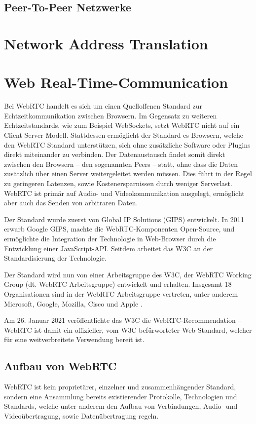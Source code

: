 \subsection{Peer-To-Peer Netzwerke}

\section{Network Address Translation}

\section{Web Real-Time-Communication}
Bei \ac{WebRTC} handelt es sich um einen Quelloffenen Standard zur Echtzeitkommunikation zwischen Browsern. Im Gegensatz zu weiteren Echtzeitstandards, wie zum Beispiel WebSockets, setzt \acs{WebRTC} nicht auf ein Client-Server Modell. Stattdessen ermöglicht der Standard es Browsern, welche den \acs{WebRTC} Standard unterstützen, sich ohne zusätzliche Software oder Plugins direkt miteinander zu verbinden. Der Datenaustausch findet somit direkt zwischen den Browsern -- den sogenannten Peers -- statt, ohne dass die Daten zusätzlich über einen Server weitergeleitet werden müssen. Dies führt in der Regel zu geringeren Latenzen, sowie Kostenersparnissen durch weniger Serverlast. WebRTC ist primär auf Audio- und Videokommunikation ausgelegt, ermöglicht aber auch das Senden von arbitraren Daten.\par

Der Standard wurde zuerst von Global IP Solutions (GIPS) entwickelt. In 2011 erwarb Google GIPS, machte die \acs{WebRTC}-Komponenten Open-Source, und ermöglichte die Integration der Technologie in Web-Browser durch die Entwicklung einer JavaScript-\acs{API}. Seitdem arbeitet das \acs{W3C} an der Standardisierung der Technologie.

Der Standard wird nun von einer Arbeitsgruppe des \acs{W3C}, der \acs{WebRTC} Working Group (dt. WebRTC Arbeitsgruppe) entwickelt und erhalten. Insgesamt 18 Organisationen sind in der WebRTC Arbeitsgruppe vertreten, unter anderem Microsoft, Google, Mozilla, Cisco und Apple \cite{webRTCWorkingGroup}.\par

Am 26. Januar 2021 veröffentlichte das \acs{W3C} die \acs{WebRTC}-Recommendation -- \acs{WebRTC} ist damit ein offizieller, vom \acs{W3C} befürworteter Web-Standard, welcher für eine weitverbreitete Verwendung bereit ist. 

\subsection{Aufbau von WebRTC}
WebRTC ist kein proprietärer, einzelner und zusammenhängender Standard, sondern eine Ansammlung bereits existierender Protokolle, Technologien und Standards, welche unter anderem den Aufbau von Verbindungen, Audio- und Videoübertragung, sowie Datenübertragung regeln.\par

